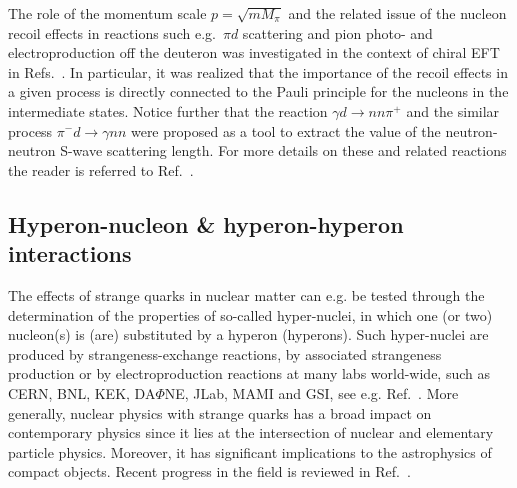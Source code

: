 \documentclass[aps,rmp,nofootinbib,twocolumn,floatfix]{revtex4}
\begin{document}
The role of the momentum scale $p = \sqrt{m M_\pi}$ and the related issue of
the nucleon recoil effects in reactions such e.g.~$\pi d$ scattering and pion photo- and
electroproduction off the deuteron was investigated in the context of chiral
EFT in Refs.~\cite{Baru:2004kw,Lensky:2005hb,Lensky:2006wd}. In particular, it
was realized that the importance of the recoil effects in a given
process is directly connected to the Pauli principle for the nucleons in the
intermediate states. Notice further that the reaction $\gamma d \to nn \pi^+$
\cite{Lensky:2007zc}
and the similar process $\pi^- d \to \gamma nn$ \cite{Gardestig:2005pp} were
proposed as a tool to 
extract the value of the neutron-neutron S-wave scattering length. For more
details on these and related reactions the reader is referred to
Ref.~\cite{Hanhart:2007ym}.    



\subsection{Hyperon-nucleon \& hyperon-hyperon interactions}
\label{sec:YN}


The effects of strange quarks in nuclear matter can e.g. be tested
through the determination of the properties of so-called hyper-nuclei,
in which one (or two) nucleon(s) is (are) substituted by a hyperon
(hyperons). Such hyper-nuclei are produced by strangeness-exchange
reactions,  by associated strangeness production or by electroproduction
reactions at many labs world-wide, such as CERN, BNL, KEK, DA$\Phi$NE,
JLab, MAMI and GSI, see e.g. Ref.~\cite{Alberico:2001jb}.
More generally,  nuclear physics with strange quarks 
has a broad impact on contemporary physics  since it lies at the intersection 
of nuclear and elementary particle physics. Moreover, it has significant 
implications to the astrophysics of compact objects. Recent progress
in the field is reviewed in Ref.~\cite{BGM}.
\end{document}
